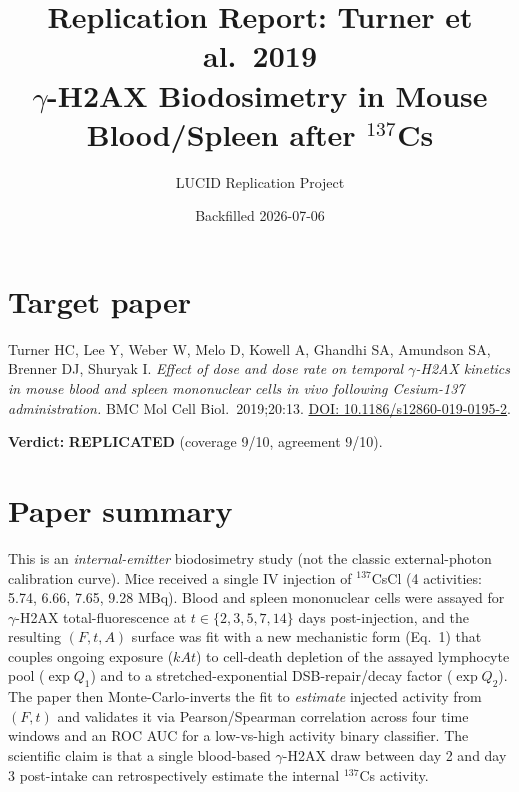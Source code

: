 \documentclass[11pt]{article}
\title{Replication Report: Turner et al.\ 2019 \\
       $\gamma$-H2AX Biodosimetry in Mouse Blood/Spleen after $^{137}$Cs}
\author{LUCID Replication Project}
\date{Backfilled 2026-07-06}
\begin{document}
\maketitle

\section*{Target paper}
Turner HC, Lee Y, Weber W, Melo D, Kowell A, Ghandhi SA, Amundson SA,
Brenner DJ, Shuryak I. \emph{Effect of dose and dose rate on temporal
$\gamma$-H2AX kinetics in mouse blood and spleen mononuclear cells in vivo
following Cesium-137 administration.} BMC Mol Cell Biol.\ 2019;20:13.
\href{https://doi.org/10.1186/s12860-019-0195-2}{DOI: 10.1186/s12860-019-0195-2}.

\textbf{Verdict:} \textbf{REPLICATED} (coverage 9/10, agreement 9/10).

\section{Paper summary}
This is an \emph{internal-emitter} biodosimetry study (not the classic
external-photon calibration curve). Mice received a single IV injection of
$^{137}$CsCl (4 activities: 5.74, 6.66, 7.65, 9.28 MBq). Blood and spleen
mononuclear cells were assayed for $\gamma$-H2AX total-fluorescence at
$t \in \{2, 3, 5, 7, 14\}$ days post-injection, and the resulting
$(F, t, A)$ surface was fit with a new mechanistic form (Eq.~1) that
couples ongoing exposure ($k A t$) to cell-death depletion of the assayed
lymphocyte pool ($\exp Q_1$) and to a stretched-exponential
DSB-repair/decay factor ($\exp Q_2$). The paper then Monte-Carlo-inverts
the fit to \emph{estimate} injected activity from $(F, t)$ and validates
it via Pearson/Spearman correlation across four time windows and an ROC
AUC for a low-vs-high activity binary classifier. The scientific claim
is that a single blood-based $\gamma$-H2AX draw between day 2 and day 3
post-intake can retrospectively estimate the internal $^{137}$Cs activity.
\end{document}
